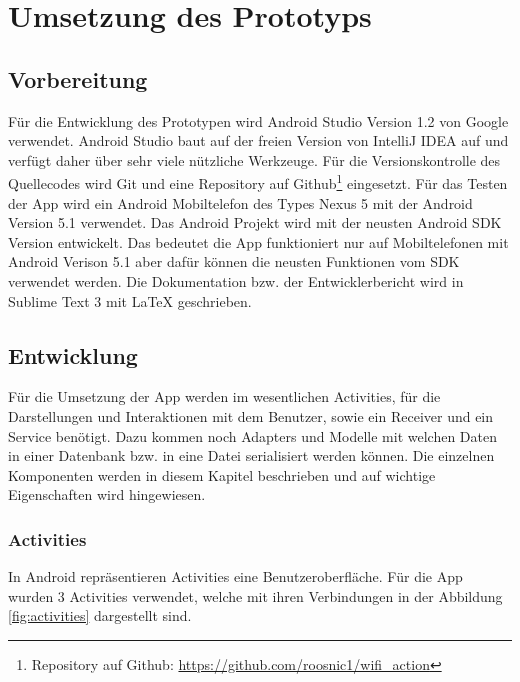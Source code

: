 \chapter{Umsetzung des Prototyps}
\label{sec:umsetzung}

\section{Vorbereitung}

Für die Entwicklung des Prototypen wird Android Studio Version 1.2 von Google verwendet. Android Studio baut auf der freien Version von IntelliJ IDEA auf und verfügt daher über sehr viele nützliche Werkzeuge. Für die Versionskontrolle des Quellecodes wird Git und eine Repository auf Github\footnote{Repository auf Github: \url{https://github.com/roosnic1/wifi_action}} eingesetzt. Für das Testen der App wird ein Android Mobiltelefon des Types Nexus 5 mit der Android Version 5.1 verwendet. Das Android Projekt wird mit der neusten Android SDK Version entwickelt. Das bedeutet die App funktioniert nur auf Mobiltelefonen mit Android Verison 5.1 aber dafür können die neusten Funktionen vom SDK verwendet werden. Die Dokumentation bzw. der Entwicklerbericht wird in Sublime Text 3 mit \LaTeX{} geschrieben.

\section{Entwicklung}
Für die Umsetzung der App werden im wesentlichen Activities, für die Darstellungen und Interaktionen mit dem Benutzer, sowie ein Receiver und ein Service benötigt. Dazu kommen noch Adapters und Modelle mit welchen Daten in einer Datenbank bzw. in eine Datei serialisiert werden können. Die einzelnen Komponenten werden in diesem Kapitel beschrieben und auf wichtige Eigenschaften wird hingewiesen.

\subsection{Activities}
In Android repräsentieren Activities eine Benutzeroberfläche. Für die App wurden 3 Activities verwendet, welche mit ihren Verbindungen in der Abbildung \ref{fig:activities} dargestellt sind.

